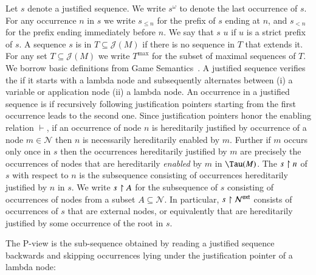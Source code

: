 \documentclass{elsarticle}
\theoremstyle{plain}
\theoremstyle{definition}
\newcommand\Nodes{\mathcal{N}}%
\newcommand{\enables}{\vdash} %
\newcommand{\ctree}{\Tau} %
\newcommand{\ExternalNodes}{\Nodes^{\sf ext}}
\def\justseqset{\mathcal{J}}
\begin{document}
Let $s$ denote a justified sequence. We write $s^\omega$ to denote the last occurrence of $s$. For any occurrence $n$ in $s$ we write $s_{\leq n}$ for the prefix of $s$ ending at $n$, and $s_{<n}$ for the prefix ending immediately before $n$.
We say that $s$  $u$ if $u$ is a strict prefix of $s$.
A sequence $s$ is  in $T\subseteq \justseqset(M)$ if there is no sequence in $T$ that extends it.
%
For any set $T\subseteq \justseqset(M)$ we write $T^{\max}$ for the subset of maximal sequences of $T$.
%
We borrow basic definitions from Game Semantics~\cite{Abr02}. A justified sequence verifies the  if it starts with a lambda node and subsequently alternates between (i) a variable or application node (ii) a lambda node.
An occurrence in a justified sequence is  if recursively following justification pointers starting from the first occurrence leads to the second one.
Since justification pointers honor the enabling relation $\enables$, if an occurrence of node $n$ is hereditarily justified by occurrence of a node $m\in\Nodes$ then $n$ is necessarily hereditarily enabled by $m$. Further if $m$ occurs only once in $s$ then the occurrences hereditarily justified by $m$ are precisely the occurrences of nodes that are hereditarily \emph{enabled} by $m$ in $\ctree(M)$.
%
The  $s\upharpoonright n$ of $s$ with respect to $n$ is the subsequence consisting of occurrences hereditarily justified by $n$ in $s$. We write $s \upharpoonright A$ for the subsequence of $s$ consisting of occurrences of nodes from a subset $A \subseteq \Nodes$.
In particular, $s\filter\ExternalNodes$ consists of occurrences of $s$ that are external nodes, or equivalently that are hereditarily justified by some occurrence of the root in $s$.

The P-view is the sub-sequence obtained by reading a justified sequence backwards and skipping occurrences lying under the justification pointer of a lambda node:
\end{document}
